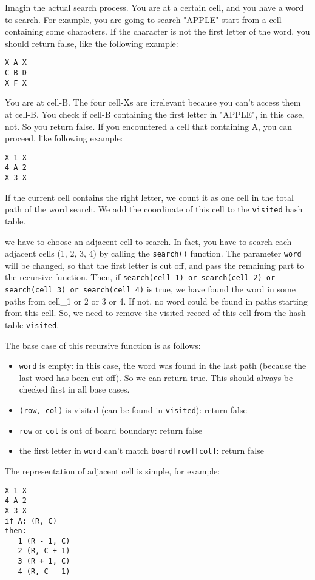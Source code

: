 \documentclass[12pt]{article}
\begin{document}
Imagin the actual search process. You are at a certain cell, and you have a word to search. For example, you are going to search "APPLE" start from a cell containing some characters. If the character is not the first letter of the word, you should return false, like the following example:
\begin{verbatim}
X A X
C B D
X F X
\end{verbatim}
You are at cell-B. The four cell-Xs are irrelevant because you can't access them at cell-B. You check if cell-B containing the first letter in "APPLE", in this case, not. So you return false. If you encountered a cell that containing A, you can proceed, like following example:
\begin{verbatim}
X 1 X
4 A 2
X 3 X
\end{verbatim}
If the current cell contains the right letter, we count it as one cell in the total path of the word search. We add the coordinate of this cell to the \texttt{visited} hash table. 

we have to choose an adjacent cell to search. In fact, you have to search each adjacent cells (1, 2, 3, 4) by calling the \texttt{search()} function. The parameter \texttt{word} will be changed, so that the first letter is cut off, and pass the remaining part to the recursive function. Then, if \texttt{search(cell\_1) or search(cell\_2) or search(cell\_3) or search(cell\_4)} is true, we have found the word in some paths from cell\_1 or 2 or 3 or 4. If not, no word could be found in paths starting from this cell. So, we need to remove the visited record of this cell from the hash table \texttt{visited}.

The base case of this recursive function is as follows:
\begin{itemize}
\item \texttt{word} is empty: in this case, the word was found in the last path (because the last word has been cut off). So we can return true. This should always be checked first in all base cases.
\item \texttt{(row, col)} is visited (can be found in \texttt{visited}): return false
\item \texttt{row} or \texttt{col} is out of board boundary: return false
\item the first letter in \texttt{word} can't match \texttt{board[row][col]}: return false
\end{itemize}

The representation of adjacent cell is simple, for example:
\begin{verbatim}
X 1 X
4 A 2
X 3 X
if A: (R, C)
then:
   1 (R - 1, C)
   2 (R, C + 1)
   3 (R + 1, C)
   4 (R, C - 1)
\end{verbatim}
\end{document}
